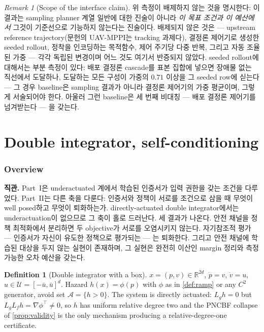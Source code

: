 \documentclass[11pt]{article}
\theoremstyle{plain}
\theoremstyle{definition}
\newtheorem{definition}[theorem]{Definition}
\theoremstyle{remark}
\newtheorem{remark}[theorem]{Remark}
\newcommand{\R}{\mathbb{R}}
\newcommand{\calU}{\mathcal{U}}
\newcommand{\calA}{\mathcal{A}}
\newcommand{\Lg}{L_g}
\newcommand{\Lf}{L_f}
\newcommand{\grad}{\nabla}
\begin{document}
\begin{remark}[Scope of the interface claim]\label{rem:iface-scope}
위 측정이 배제하지 않는 것을 명시한다: 이 결과는 sampling planner 계열 일반에 대한 진술이
아니라 \emph{이 목표 조건과 이 예산에서} 그것이 기준선으로 기능하지 않는다는 진술이다.
배제되지 않은 것은 --- upstream reference trajectory(문헌의 UAV-MPPI는 tracking 과제다),
결정론 제어기로 생성한 seeded rollout, 정착을 인코딩하는 목적함수, 제어 주기당 다중 반복,
그리고 자동 조율된 가중 --- 각각 독립된 변경이며 어느 것도 여기서 반증되지 않았다.
seeded rollout에 대해서는 부분 측정이 있다: 배포 결정론 cascade를 표본 집합에 넣으면 장애물
없는 직선에서 도달하나, 도달하는 모든 구성이 가중의 $0.71$ 이상을 그 seeded row에 싣는다 ---
그 경우 baseline은 sampling 결과가 아니라 결정론 제어기의 가중 평균이며, 그렇게 서술되어야 한다.
아울러 그런 baseline은 세 번째 비대칭 --- 배포 결정론 제어기를 넘겨받는다 --- 을 갖는다.
\end{remark}

\clearpage
\part{Double integrator, self-conditioning}

\section{Overview}\label{sec:di-overview}

\textbf{직관.} Part~I은 underactuated 계에서 학습된 인증서가 입력 권한을 갖는 조건을 다루었다.
Part~II는 다른 축을 다룬다: 인증서와 정책이 서로를 조건으로 삼을 때 무엇이 well posed하고 무엇이
퇴화하는가. directly-actuated double integrator에서는 underactuation이 없으므로 그 축이 홀로 드러난다.
세 결과가 나온다. 안전 채널을 정책 최적화에서 분리하면 두 objective가 서로를 오염시키지 않는다.
자기참조적 평가 --- 인증서가 자신이 유도한 정책으로 평가되는 --- 는 퇴화한다. 그리고 안전 채널에
학습된 대상을 두지 않는 실현이 존재하며, 그 실현은 완전히 이산인 margin 정리와 측정 가능한 오차
예산을 갖는다.

\begin{definition}[Double integrator with a box]\label{def:di}
$x=(p,v)\in\R^{2d}$, $\dot p=v$, $\dot v=u$, $u\in\calU=[-\bar u,\bar u]^d$. Hazard
$h(x)=\phi(p)$ with $\phi$ as in \cref{def:ramp} or any $C^2$ generator, avoid set
$\calA=\{h>0\}$. The system is directly actuated: $\Lg h=0$ but $\Lg\Lf h=\grad\phi^\top\neq0$,
so $h$ has uniform relative degree two and the PNCBF collapse of \cref{prop:validity} is the
only mechanism producing a relative-degree-one certificate.
\end{definition}
\end{document}
